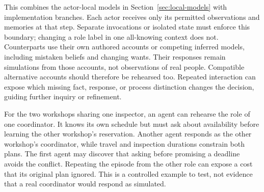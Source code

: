 \documentclass[10pt]{article}
\begin{document}
This combines the actor-local models in Section~\ref{sec:local-models} with
implementation branches. Each actor receives only its permitted observations
and memories at that step. Separate invocations or isolated state must enforce
this boundary; changing a role label in one all-knowing context does not.
Counterparts use their own authored accounts or competing inferred models,
including mistaken beliefs and changing wants. Their responses remain
simulations from those accounts, not observations of real people. Compatible
alternative accounts should therefore be rehearsed too. Repeated interaction
can expose which missing fact, response, or process distinction changes the
decision, guiding further inquiry or refinement.

For the two workshops sharing one inspector, an agent can rehearse the role
of one coordinator. It knows its own schedule but must ask about availability
before learning the other workshop's reservation. Another agent responds as
the other workshop's coordinator, while travel and inspection durations
constrain both plans.
The first agent may discover that asking before promising a deadline avoids
the conflict. Repeating the episode from the other role can expose a cost that
its original plan ignored. This is a controlled example to test, not evidence
that a real coordinator would respond as simulated.
\end{document}
